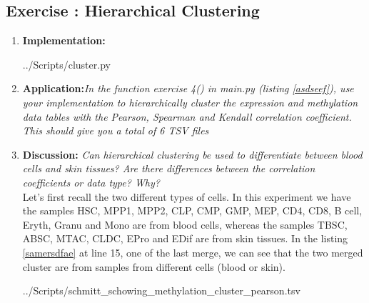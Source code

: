 \documentclass[10pt,a4paper]{article}
\newcommand{\exercise}[1]
{
  \stepcounter{subsection}
  \subsection*{Exercise \thesubsection: #1}

}
\begin{document}
\newpage
\exercise{Hierarchical Clustering}
\begin{enumerate}
	
	\item \textbf{Implementation: }
	
	 {../Scripts/cluster.py}
	
	\item \textbf{Application:}\textit{In the function exercise 4() in main.py (listing \ref{asdseef}), use your implementation to hierarchically cluster the expression and methylation data tables with the Pearson, Spearman and Kendall correlation coefficient. This should give you a total of 6 TSV files}\\
	
	
	\item \textbf{Discussion: }\textit{Can hierarchical clustering be used to differentiate between blood cells and skin tissues? Are there differences between the correlation coefficients or data type? Why?}\\
	
	Let's first recall the two different types of cells. In this experiment we have the samples HSC, MPP1, MPP2, CLP, CMP, GMP, MEP, CD4, CD8, B cell, Eryth, Granu and Mono are from blood cells, whereas the samples TBSC, ABSC, MTAC, CLDC, EPro
	and EDif are from skin tissues. In the listing \ref{samersdfae} at line 15, one of the last merge, we can see that the two merged cluster are from samples from different cells (blood or skin). 
	
	 {../Scripts/schmitt\string_schowing\string_methylation\string_cluster\string_pearson.tsv}
	
	
	
	
	
\end{enumerate}
\end{document}
